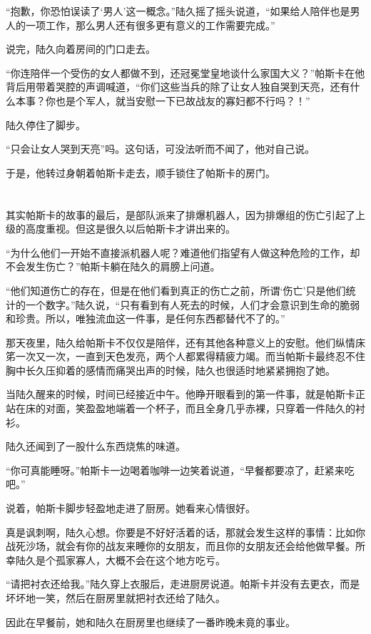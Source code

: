 “抱歉，你恐怕误读了‘男人’这一概念。”陆久摇了摇头说道，“如果给人陪伴也是男人的一项工作，那么男人还有很多更有意义的工作需要完成。”

说完，陆久向着房间的门口走去。

“你连陪伴一个受伤的女人都做不到，还冠冕堂皇地谈什么家国大义？”帕斯卡在他背后用带着哭腔的声调喊道，“你们这些当兵的除了让女人独自哭到天亮，还有什么本事？你也是个军人，就当安慰一下已故战友的寡妇都不行吗？！”

陆久停住了脚步。

“只会让女人哭到天亮”吗。这句话，可没法听而不闻了，他对自己说。

于是，他转过身朝着帕斯卡走去，顺手锁住了帕斯卡的房门。\section*{}

其实帕斯卡的故事的最后，是部队派来了排爆机器人，因为排爆组的伤亡引起了上级的高度重视。但这是很久以后帕斯卡才讲出来的。

“为什么他们一开始不直接派机器人呢？难道他们指望有人做这种危险的工作，却不会发生伤亡？”帕斯卡躺在陆久的肩膀上问道。

“他们知道伤亡的存在，但是在他们看到真正的伤亡之前，所谓‘伤亡’只是他们统计的一个数字。”陆久说，“只有看到有人死去的时候，人们才会意识到生命的脆弱和珍贵。所以，唯独流血这一件事，是任何东西都替代不了的。”

那天夜里，陆久给帕斯卡不仅仅是陪伴，还有其他各种意义上的安慰。他们纵情床笫一次又一次，一直到天色发亮，两个人都累得精疲力竭。而当帕斯卡最终忍不住胸中长久压抑着的感情而痛哭出声的时候，陆久也很适时地紧紧拥抱了她。

当陆久醒来的时候，时间已经接近中午。他睁开眼看到的第一件事，就是帕斯卡正站在床的对面，笑盈盈地端着一个杯子，而且全身几乎赤裸，只穿着一件陆久的衬衫。

陆久还闻到了一股什么东西烧焦的味道。

“你可真能睡呀。”帕斯卡一边喝着咖啡一边笑着说道，“早餐都要凉了，赶紧来吃吧。”

说着，帕斯卡脚步轻盈地走进了厨房。她看来心情很好。

真是讽刺啊，陆久心想。你要是不好好活着的话，那就会发生这样的事情：比如你战死沙场，就会有你的战友来睡你的女朋友，而且你的女朋友还会给他做早餐。所幸陆久是个孤家寡人，大概不会在这个地方吃亏。

“请把衬衣还给我。”陆久穿上衣服后，走进厨房说道。帕斯卡并没有去更衣，而是坏坏地一笑，然后在厨房里就把衬衣还给了陆久。

因此在早餐前，她和陆久在厨房里也继续了一番昨晚未竟的事业。

